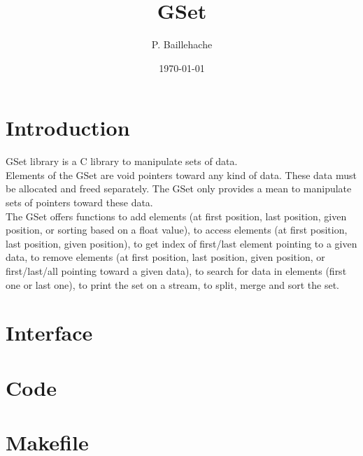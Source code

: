 \documentclass[12pt, a4paper]{article}
\begin{document}
\title{GSet}
\author{P. Baillehache}
\date{\today}
\maketitle

\tableofcontents

\section*{Introduction}

GSet library is a C library to manipulate sets of data.\\

Elements of the GSet are void pointers toward any kind of data. These data must be allocated and freed separately. The GSet only provides a mean to manipulate sets of pointers toward these data.\\

The GSet offers functions to add elements (at first position, last position, given position, or sorting based on a float value), to access elements (at first position, last position, given position), to get index of first/last element pointing to a given data, to remove elements (at first position, last position, given position, or first/last/all pointing toward a given data), to search for data in elements (first one or last one), to print the set on a stream, to split, merge and sort the set.\\ 

\section{Interface}

\begin{scriptsize}
\begin{ttfamily}

\end{ttfamily}
\end{scriptsize}

\section{Code}

\begin{scriptsize}
\begin{ttfamily}

\end{ttfamily}
\end{scriptsize}


\section{Makefile}
\end{document}
